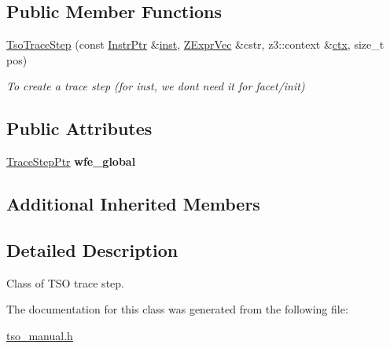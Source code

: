\subsection*{Public Member Functions}
\begin{DoxyCompactItemize}
\item 
\mbox{\label{classilang_1_1_tso_trace_step_a434149427667034990865cefdd9c410d}} 
\mbox{\hyperlink{classilang_1_1_tso_trace_step_a434149427667034990865cefdd9c410d}{Tso\+Trace\+Step}} (const \mbox{\hyperlink{namespaceilang_af88a19312ae653d687a0d1207bb284f6}{Instr\+Ptr}} \&\mbox{\hyperlink{classilang_1_1_trace_step_ad46be2e7ab006f89051c91dd939ece7a}{inst}}, \mbox{\hyperlink{classilang_1_1_trace_step_a19a387426712dbec11dcecf170fb7e1a}{Z\+Expr\+Vec}} \&cstr, z3\+::context \&\mbox{\hyperlink{classilang_1_1_trace_step_afcab3e7a5ce7b619dd445882a9846c93}{ctx}}, size\+\_\+t pos)
\begin{DoxyCompactList}\small\item\em To create a trace step (for inst, we don\textquotesingle{}t need it for facet/init) \end{DoxyCompactList}\end{DoxyCompactItemize}
\subsection*{Public Attributes}
\begin{DoxyCompactItemize}
\item 
\mbox{\label{classilang_1_1_tso_trace_step_a2c5551fa0a11fa8839bb5c7b6220959a}} 
\mbox{\hyperlink{classilang_1_1_trace_step_a33d28af7bafbd3eadec8a957c63738ca}{Trace\+Step\+Ptr}} {\bfseries wfe\+\_\+global}
\end{DoxyCompactItemize}
\subsection*{Additional Inherited Members}


\subsection{Detailed Description}
Class of T\+SO trace step. 

The documentation for this class was generated from the following file\+:\begin{DoxyCompactItemize}
\item 
\mbox{\hyperlink{tso__manual_8h}{tso\+\_\+manual.\+h}}\end{DoxyCompactItemize}
